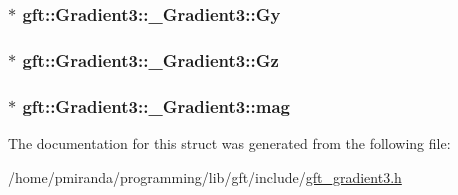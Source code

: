 \subsubsection[{\texorpdfstring{Gy}{Gy}}]{$\ast$ gft\+::\+Gradient3\+::\+\_\+\+Gradient3\+::\+Gy}\hypertarget{structgft_1_1Gradient3_1_1__Gradient3_ae929510403073f2e3398652e1caeb9ca}{}\label{structgft_1_1Gradient3_1_1__Gradient3_ae929510403073f2e3398652e1caeb9ca}
\subsubsection[{\texorpdfstring{Gz}{Gz}}]{$\ast$ gft\+::\+Gradient3\+::\+\_\+\+Gradient3\+::\+Gz}\hypertarget{structgft_1_1Gradient3_1_1__Gradient3_a565c66b7cb3f64c121a40149132508f7}{}\label{structgft_1_1Gradient3_1_1__Gradient3_a565c66b7cb3f64c121a40149132508f7}
\subsubsection[{\texorpdfstring{mag}{mag}}]{$\ast$ gft\+::\+Gradient3\+::\+\_\+\+Gradient3\+::mag}\hypertarget{structgft_1_1Gradient3_1_1__Gradient3_adb0a7878ed7937b3112430914f40ed2d}{}\label{structgft_1_1Gradient3_1_1__Gradient3_adb0a7878ed7937b3112430914f40ed2d}


The documentation for this struct was generated from the following file\+:\begin{DoxyCompactItemize}
\item 
/home/pmiranda/programming/lib/gft/include/\hyperlink{gft__gradient3_8h}{gft\+\_\+gradient3.\+h}\end{DoxyCompactItemize}
